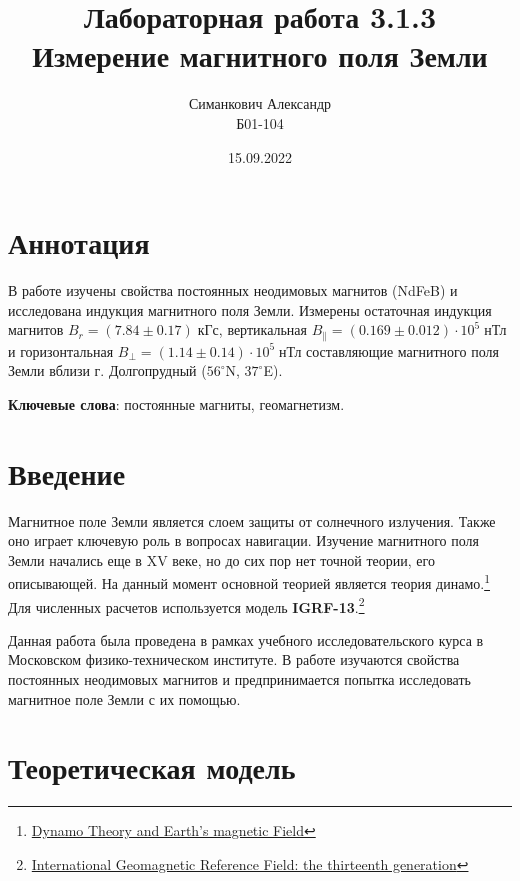 \documentclass[12pt,a4paper]{article}
\title{Лабораторная работа 3.1.3\\ Измерение магнитного поля Земли}
\author{Симанкович Александр \\ Б01-104}
\date{15.09.2022}
\begin{document}
	\maketitle
	
	\section*{Аннотация}
	
	В работе изучены свойства постоянных неодимовых магнитов (NdFeB) и исследована индукция магнитного поля Земли. Измерены остаточная индукция магнитов $B_r = (7.84 \pm 0.17) \; \text{кГс}$, вертикальная  $B_\parallel = (0.169 \pm 0.012) \cdot 10^5 \; \text{нТл}$ и горизонтальная $ B_{\perp} = (1.14 \pm 0.14) \cdot 10^5 \; \text{нТл}$ составляющие магнитного поля Земли вблизи г. Долгопрудный ($56^\circ$N, $37 ^\circ$E).
	
	\vspace{10pt}
	\noindent\textbf{Ключевые слова}: постоянные магниты, геомагнетизм.
	
	\section*{Введение}
	
	Магнитное поле Земли является слоем защиты от солнечного излучения. Также оно играет ключевую роль в вопросах навигации. Изучение магнитного поля Земли начались еще в XV веке, но до сих пор нет точной теории, его описывающей. На данный момент основной теорией является теория динамо.\footnote{
		\href{https://web.archive.org/web/20070221094040/http://setiathome.berkeley.edu/~pauld/etc/210BPaper.pdf}{Dynamo Theory and Earth's magnetic Field}
	}
	Для численных расчетов используется модель \textbf{IGRF-13}.\footnote{
		\href{https://earth-planets-space.springeropen.com/articles/10.1186/s40623-020-01288-x}
		{International Geomagnetic Reference Field: the thirteenth generation}
	}

	Данная работа была проведена в рамках учебного исследовательского курса в Московском физико-техническом институте. В работе изучаются свойства постоянных неодимовых магнитов и предпринимается попытка исследовать магнитное поле Земли с их помощью.
	
	\section*{Теоретическая модель}
	
\end{document}
